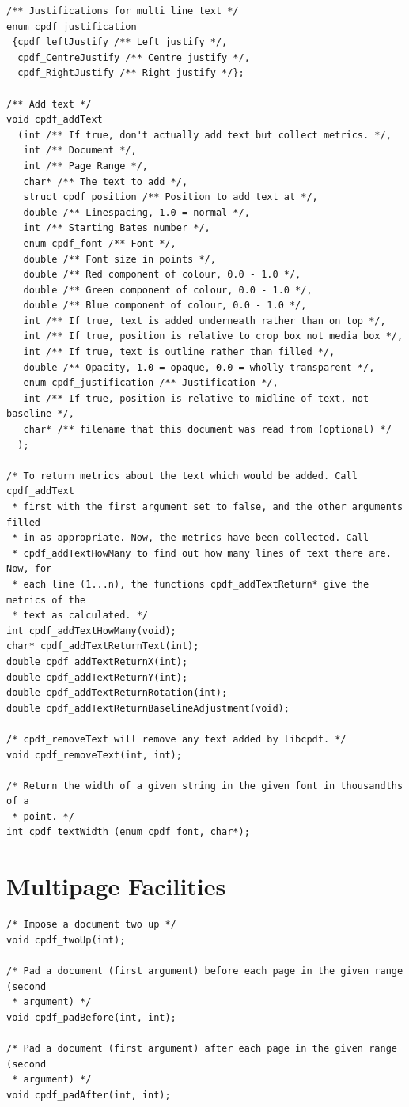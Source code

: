 \documentclass[a4paper]{memoir}
\begin{document}
\begin{small}
\begin{lstlisting}
/** Justifications for multi line text */
enum cpdf_justification
 {cpdf_leftJustify /** Left justify */,
  cpdf_CentreJustify /** Centre justify */,
  cpdf_RightJustify /** Right justify */};

/** Add text */
void cpdf_addText
  (int /** If true, don't actually add text but collect metrics. */,
   int /** Document */,
   int /** Page Range */,
   char* /** The text to add */,
   struct cpdf_position /** Position to add text at */,
   double /** Linespacing, 1.0 = normal */,
   int /** Starting Bates number */,
   enum cpdf_font /** Font */,
   double /** Font size in points */,
   double /** Red component of colour, 0.0 - 1.0 */,
   double /** Green component of colour, 0.0 - 1.0 */,
   double /** Blue component of colour, 0.0 - 1.0 */,
   int /** If true, text is added underneath rather than on top */,
   int /** If true, position is relative to crop box not media box */,
   int /** If true, text is outline rather than filled */,
   double /** Opacity, 1.0 = opaque, 0.0 = wholly transparent */,
   enum cpdf_justification /** Justification */,
   int /** If true, position is relative to midline of text, not baseline */,
   char* /** filename that this document was read from (optional) */
  );

/* To return metrics about the text which would be added. Call cpdf_addText
 * first with the first argument set to false, and the other arguments filled
 * in as appropriate. Now, the metrics have been collected. Call
 * cpdf_addTextHowMany to find out how many lines of text there are. Now, for
 * each line (1...n), the functions cpdf_addTextReturn* give the metrics of the
 * text as calculated. */
int cpdf_addTextHowMany(void);
char* cpdf_addTextReturnText(int);
double cpdf_addTextReturnX(int);
double cpdf_addTextReturnY(int);
double cpdf_addTextReturnRotation(int);
double cpdf_addTextReturnBaselineAdjustment(void);

/* cpdf_removeText will remove any text added by libcpdf. */
void cpdf_removeText(int, int);

/* Return the width of a given string in the given font in thousandths of a
 * point. */
int cpdf_textWidth (enum cpdf_font, char*);
\end{lstlisting}
\end{small}

\chapter{Multipage Facilities}
\begin{small}
\begin{lstlisting}
/* Impose a document two up */
void cpdf_twoUp(int);

/* Pad a document (first argument) before each page in the given range (second
 * argument) */
void cpdf_padBefore(int, int);

/* Pad a document (first argument) after each page in the given range (second
 * argument) */
void cpdf_padAfter(int, int);
\end{lstlisting}
\end{small}
\end{document}
